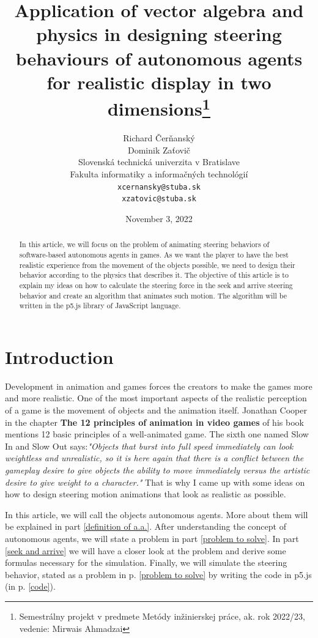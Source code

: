 \documentclass[10pt,twoside,english,a4paper]{article}
\title{Application of vector algebra and physics in 
designing steering behaviours of autonomous agents for 
realistic display in two dimensions\thanks{Semestrálny projekt v 
predmete Metódy inžinierskej práce, ak. rok 2022/23, 
vedenie: Mirwais Ahmadzai}}
\author{Richard Čerňanský\\
		Dominik Zaťovič\\[2pt]
	{\small Slovenská technická univerzita v Bratislave}\\
	{\small Fakulta informatiky a informačných technológií}\\
	{\small \texttt{xcernansky@stuba.sk}}\\
	{\small \texttt{xzatovic@stuba.sk}}
	}
\date{\small November 3, 2022 }
\begin{document}
\maketitle

\begin{abstract}

    In this article, we will focus on the problem of animating steering 
    behaviors of software-based autonomous agents in 
    games. As we want the player to have the best realistic experience
    from the movement of the objects possible, we need to design 
    their behavior according to the physics that describes it. 
    The objective of this article is to explain my ideas on how to calculate 
    the steering force in the seek and arrive steering behavior and create 
    an algorithm that animates such motion. The algorithm will be written
    in the p5.js library of JavaScript language. 

\end{abstract}

\section{Introduction}

Development in animation and games forces the creators to make 
the games more and more realistic. One of the most important 
aspects of the realistic perception of a game is the movement of 
objects and the animation itself. Jonathan Cooper in the chapter 
\textbf{The 12 principles of animation in video games}\cite{Cooper} 
of his book mentions 12 basic principles of a well-animated game. 
The sixth one named Slow In and Slow Out says:\emph{"Objects that burst into full 
speed immediately can look weightless and unrealistic, so it is here 
again that there is a conflict between the gameplay desire to give 
objects the ability to move immediately versus the artistic desire to give weight 
to a character."} That is why I came up with some ideas on how to 
design steering motion animations that look as realistic as possible.

In this article, we will call the objects autonomous agents. 
More about them will be explained in part \ref{definition of a.a.}. 
After understanding the concept of autonomous agents, we will state 
a problem in part \ref{problem to solve}. In part \ref{seek and 
arrive} we will have a closer look at the problem and derive some 
formulas necessary for the simulation. Finally, we will simulate 
the steering behavior, stated as a problem in p. \ref{problem to 
solve} by writing the code in p5.js (in p. \ref{code}).
\end{document}

